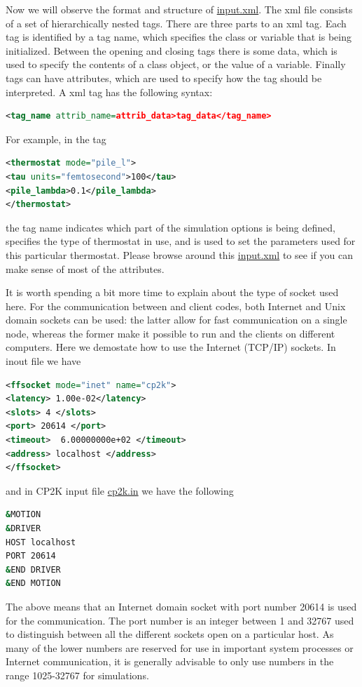\documentclass{article}
\begin{document}
\begin{Exercise}[label={inputs},title={Keywords, outputs, and units of \ipi{}}]
\Question
Now we will observe the format and structure of \url{input.xml}.
The xml file consists of a set of hierarchically nested tags. There are three
parts to an xml tag. Each tag is identified by a tag name, which specifies the class
or variable that is being initialized. Between the opening and closing tags there is some data, 
which is used to specify the
contents of a class object, or the value of a variable. Finally tags can have attributes,
which are used to specify how the tag should be interpreted.
A xml tag has the following syntax:
\begin{lstlisting}[language=xml]
<tag_name attrib_name=attrib_data>tag_data</tag_name>
\end{lstlisting}
For example, in the tag
\begin{lstlisting}[language=xml]
<thermostat mode="pile_l">
<tau units="femtosecond">100</tau> 
<pile_lambda>0.1</pile_lambda>
</thermostat>
\end{lstlisting}
the tag name  indicates which part of the simulation options is being defined,
 specifies the type of thermostat in use,
and  is used to set the parameters used for this particular thermostat.
Please browse around this \url{input.xml} to see if you can make sense of most of the attributes.

\Question
It is worth spending a bit more time to explain about the type of socket used here.
For the communication between \ipi{} and client codes, both Internet and Unix domain sockets can be used: the
latter allow for fast communication on a single node, whereas the former make it possible
to run \ipi{} and the clients on different computers.
Here we demostate how to use the Internet (TCP/IP) sockets.
In \ipi{} inout file we have
\begin{lstlisting}[language=xml]
<ffsocket mode="inet" name="cp2k">
<latency> 1.00e-02</latency>
<slots> 4 </slots>
<port> 20614 </port>
<timeout>  6.00000000e+02 </timeout>
<address> localhost </address>
</ffsocket> 
\end{lstlisting}
and in CP2K input file \url{cp2k.in} we have the following
\begin{lstlisting}[language=bash]
&MOTION
&DRIVER
HOST localhost
PORT 20614
&END DRIVER
&END MOTION
\end{lstlisting}
The above means that an Internet domain socket with port number 20614 is used for the communication.
The port number is an integer between 1 and 32767 used to distinguish between all the
different sockets open on a particular host. As many of the lower numbers are reserved
for use in important system processes or Internet communication, it is generally advisable
to only use numbers in the range 1025-32767 for simulations.


\end{Exercise}
\end{document}
